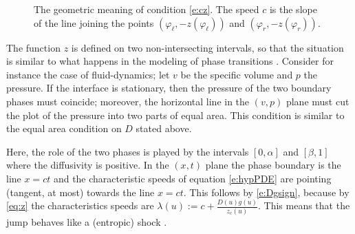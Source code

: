 \documentclass[11pt,a4paper]{article}
\renewcommand{\phi}{\varphi}
\begin{document}
\begin{figure}[htb]
\begin{center}

\end{center}
\caption{\label{f:cz}{The geometric meaning of condition \eqref{e:cz}. The speed $c$ is the slope of the line joining the points $\left(\phi_\ell,-z(\phi_\ell)\right)$ and $\left(\phi_r,-z(\phi_r)\right)$.}}
\end{figure}

The function $z$ is defined on two non-intersecting intervals, so that the situation is similar to what happens in the modeling of phase transitions \cite{Colombo-Corli_1999}. 
Consider for instance the case of fluid-dynamics; let $v$ be the specific volume and $p$ the pressure. If the interface is stationary, then the pressure of the two boundary phases must coincide; moreover, the horizontal line in the $(v,p)$ plane must cut the plot of the pressure into two parts of equal area. This condition is similar to the equal area condition on $D$ stated above.

Here, the role of the two phases is played by the intervals $[0,\alpha]$ and $[\beta,1]$ where the diffusivity is positive. In the $(x,t)$ plane the phase boundary is the line $x=ct$ and the characteristic speeds of equation \eqref{e:hypPDE} are pointing (tangent, at most) towards the line $x=ct$. This follows by \eqref{e:Dgsign}, because by \eqref{eq:z} the characteristics speeds are $\lambda(u):=c+\frac{D(u)g(u)}{z_c(u)}$.
This means that the jump behaves like a (entropic) shock \cite{Bressan, Dafermos}.
\end{document}
